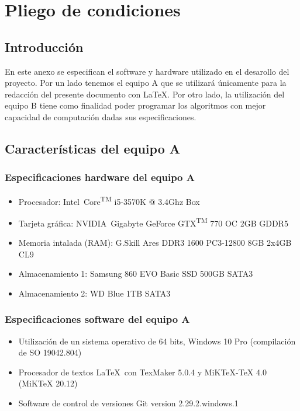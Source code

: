 \chapter{Pliego de condiciones}
\label{cha:pliego-de-condiciones}

\section{Introducción}
\label{sec:intro-pliego}

En este anexo se especifican el software y hardware utilizado en el desarollo del proyecto. Por un lado tenemos el equipo A que se utilizará únicamente para la redacción del presente documento con \LaTeX. Por otro lado, la utilización del equipo B tiene como finalidad poder programar los algoritmos con mejor capacidad de computación dadas sus especificaciones.

\section{Características del equipo A}
\label{sec:caracteristicas-equipoa}

\subsection{Especificaciones hardware del equipo A}
\label{subsec:especificaciones-hardware-equipoa}
\begin{itemize}
  \item Procesador: Intel\textregistered\ Core\textsuperscript{TM} i5-3570K @ 3.4Ghz Box
  \item Tarjeta gráfica: NVIDIA\textregistered\ Gigabyte GeForce GTX\textsuperscript{TM} 770 OC 2GB GDDR5
  \item Memoria intalada (RAM): G.Skill Ares DDR3 1600 PC3-12800 8GB 2x4GB CL9
  \item Almacenamiento 1: Samsung 860 EVO Basic SSD 500GB SATA3
  \item Almacenamiento 2: WD Blue 1TB SATA3
\end{itemize}

\subsection{Especificaciones software del equipo A}
\label{subsec:especificaciones-software-equipoa}
\begin{itemize}
  \item Utilización de un sistema operativo de 64 bits, Windows 10 Pro (compilación de SO 19042.804)
  \item Procesador de textos \LaTeX\ con TexMaker 5.0.4 y MiKTeX-TeX 4.0 (MiKTeX 20.12)
  \item Software de control de versiones Git version 2.29.2.windows.1
\end{itemize}

